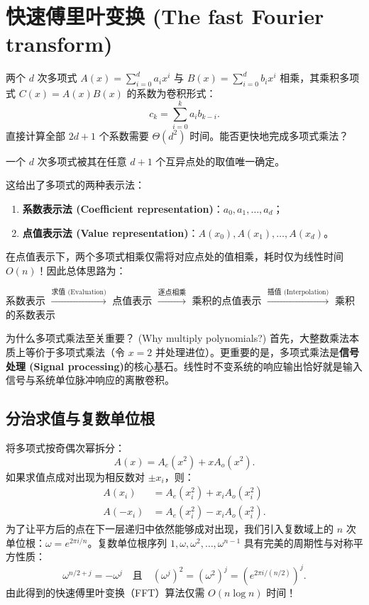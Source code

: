 \section{快速傅里叶变换 (The fast Fourier transform)}

两个 $d$ 次多项式 $A(x) = \sum_{i=0}^d a_i x^i$ 与 $B(x) = \sum_{i=0}^d b_i x^i$ 相乘，其乘积多项式 $C(x) = A(x)B(x)$ 的系数为卷积形式：
\[
c_k = \sum_{i=0}^k a_i b_{k-i}.
\]
直接计算全部 $2d+1$ 个系数需要 $\Theta(d^2)$ 时间。能否更快地完成多项式乘法？

\begin{fact}
一个 $d$ 次多项式被其在任意 $d + 1$ 个互异点处的取值唯一确定。
\end{fact}

这给出了多项式的两种表示法：
\begin{enumerate}
    \item \textbf{系数表示法 (Coefficient representation)}：$a_0, a_1, \dots, a_d$；
    \item \textbf{点值表示法 (Value representation)}：$A(x_0), A(x_1), \dots, A(x_d)$。
\end{enumerate}

在点值表示下，两个多项式相乘仅需将对应点处的值相乘，耗时仅为线性时间 $O(n)$！因此总体思路为：
\begin{center}
系数表示 $\xrightarrow{\text{求值 (Evaluation)}} $ 点值表示 $\xrightarrow{\text{逐点相乘}} $ 乘积的点值表示 $\xrightarrow{\text{插值 (Interpolation)}} $ 乘积的系数表示
\end{center}

\begin{sidebarbox}{为什么多项式乘法至关重要？ (Why multiply polynomials?)}
首先，大整数乘法本质上等价于多项式乘法（令 $x = 2$ 并处理进位）。更重要的是，多项式乘法是\textbf{信号处理 (Signal processing)}的核心基石。线性时不变系统的响应输出恰好就是输入信号与系统单位脉冲响应的离散卷积。
\end{sidebarbox}

\subsection*{分治求值与复数单位根}
将多项式按奇偶次幂拆分：
\[
A(x) = A_e(x^2) + x A_o(x^2).
\]
如果求值点成对出现为相反数对 $\pm x_i$，则：
\begin{align*}
A(x_i) &= A_e(x_i^2) + x_i A_o(x_i^2) \\
A(-x_i) &= A_e(x_i^2) - x_i A_o(x_i^2).
\end{align*}
为了让平方后的点在下一层递归中依然能够成对出现，我们引入复数域上的 $n$ 次单位根：$\omega = e^{2\pi i / n}$。复数单位根序列 $1, \omega, \omega^2, \dots, \omega^{n-1}$ 具有完美的周期性与对称平方性质：
\[
\omega^{n/2 + j} = -\omega^j \quad \text{且} \quad (\omega^j)^2 = (\omega^2)^j = (e^{2\pi i / (n/2)})^j.
\]
由此得到的快速傅里叶变换（FFT）算法仅需 $O(n \log n)$ 时间！

